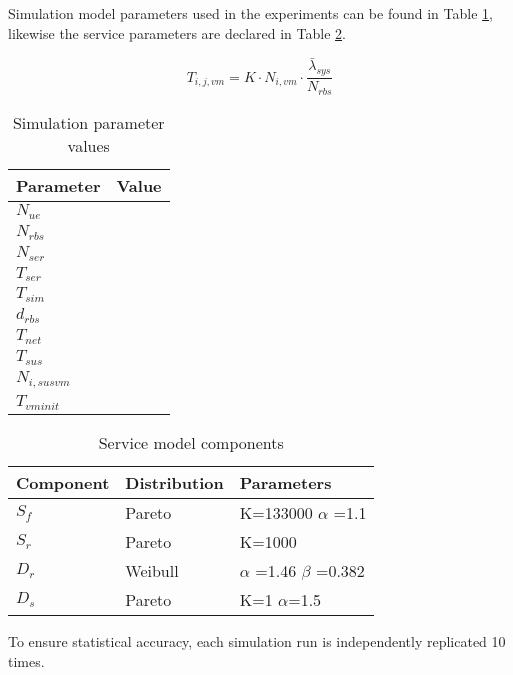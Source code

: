 Simulation model parameters used in the experiments can be found in Table \ref{table:simulation_parameters}, likewise the service parameters are declared in Table \ref{table:traffic_parameters}.

\begin{equation}
\label{eq:service_time}
T_{i,j,vm} = K \cdot N_{i,vm} \cdot \frac{ \bar{\lambda}_{sys} }{N_{rbs}}
\end{equation}

\begin{table}[tb]
 	\centering
 	
    \begin{tabular}{|l|l|} \hline
    	\textbf{Parameter}    		& \textbf{Value} \\ \hline
    	$N_{ue}$   & \\ \hline
    	$N_{rbs}$  & \\ \hline
    	$N_{ser}$  & \\ \hline
    	$T_{ser}$  & \\ \hline
    	$T_{sim}$  & \\ \hline
    	$d_{rbs}$  & \\ \hline
    	$T_{net}$  & \\ \hline
        $T_{sus}$   & \\ \hline
        $N_{i,sus vm}$ & \\ \hline
        $T_{vm init}$ & \\ \hline
    \end{tabular}
    
    \caption{Simulation parameter values}
    \label{table:simulation_parameters}
\end{table}

\begin{table}[tb]
	\centering
	
    \begin{tabular}{|l|l|l|}\hline
    	\textbf{Component}  	& \textbf{Distribution} 	& \textbf{Parameters}     \\ \hline
    	$S_f$   & Pareto   				& K=133000 $\alpha$ =1.1  \\ \hline
    	$S_r$   & Pareto    				& K=1000         \\ \hline
    	$D_r$ 	& Weibull    				& $\alpha$ =1.46 $\beta$ =0.382 \\ \hline
    	$D_s$ 	& Pareto     				& K=1 $\alpha$=1.5      \\ \hline
    \end{tabular}
    
    \caption{Service model components}
    \label{table:traffic_parameters}
\end{table}

To ensure statistical accuracy, each simulation run is independently replicated 10 times.